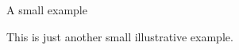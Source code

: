 \documentclass{article}
\begin{document}
\begin{huge}
\bfseries

A small example

\end{huge}
\bigskip

This is just another small illustrative example.
\end{document}
